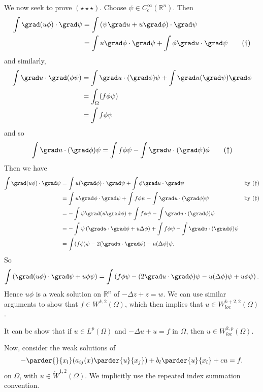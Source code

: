\documentclass[10pt, oneside, reqno]{amsart}
\theoremstyle{plain}%
\numberwithin{equation}{section}
\theoremstyle{definition}
\theoremstyle{remark}
\newcommand{\R}{\mathbb{R}}
\begin{document}
We now seek to prove $(\star \star \star)$.  Choose $\psi \in C^\infty_c(\R^n)$.  Then \begin{align*}
    \int \grad(u \phi) \cdot \grad \psi &= \int \left( \psi \grad u  + u \grad \phi \right) \cdot \grad \psi \\
    &= \int u \grad \phi \cdot \grad \psi + \int \phi \grad u \cdot \grad \psi \tag{$\dagger$} 
\end{align*} and similarly,
\begin{align*}
\int \grad u \cdot \grad(\phi \psi)  &= \int \grad u \cdot (\grad \phi) \psi + \int \grad u (\grad \psi) \grad \phi \\
&= \int_\Omega(f \phi \psi)  \\
&= \int f \phi \psi
\end{align*} and so \[
    \int \grad u \cdot (\grad \phi) \psi = \int f \phi \psi - \int \grad u \cdot (\grad \psi ) \phi \tag{$\ddag$}
\]  Then we have \begin{align*}
    \int \grad(u \phi) \cdot \grad \psi &= \int u (\grad \phi) \cdot \grad \psi + \int \phi \grad u \cdot \grad \psi &\text{by $(\dagger)$} \\
    &=  \int u \grad \phi \cdot \grad \psi + \int f \phi \psi - \int \grad u \cdot (\grad \phi) \psi &\text{by $(\ddag)$} \\
    &= - \int \psi \grad(u \grad \phi) + \int f \phi \psi - \int \grad u \cdot (\grad \phi) \psi \\
    &= - \int \psi \left( \grad u \cdot \grad \phi + u \Delta \phi \right) + \int f \phi \psi - \int \grad u \cdot (\grad \phi) \psi \\
    &= \int (f \phi) \psi - 2 (\grad u \cdot \grad \phi) - u (\Delta \phi) \psi.
\end{align*}  So \[
    \int \left( \grad(u \phi) \cdot \grad \psi + u \phi \psi \right) = \int \left(f \phi \psi - (2 \grad u \cdot \grad \phi) \psi - u (\Delta \phi) \psi + u \phi \psi\right).
\]
Hence $u \phi$ is a weak solution on $\R^n$ of $-\Delta z + z = w$.  We can use similar arguments to show that $f \in W^{k, 2}(\Omega)$, which then implies that $u \in W^{k+2, 2}_{loc}(\Omega)$.  

It can be show that if $u \in L^p(\Omega)$ and $-\Delta u + u = f$ in $\Omega$, then $u \in W^{2, p}_{loc}(\Omega)$.


Now, consider the weak solutions of \begin{equation}
    -\parder{}{x_l} (a_{ij}(x) \parder{u}{x_j}) + b_l \parder{u}{x_l} + cu = f.
\end{equation} on $\Omega$, with $u \in \dot W^{1, 2}(\Omega)$.   We implicitly use the repeated index summation convention.
\end{document}
